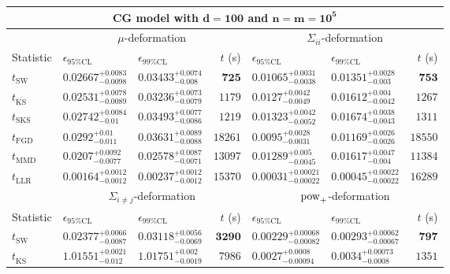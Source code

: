 \begin{tabular}{l|llr|llr}
	\toprule
	\multicolumn{7}{c}{{\bf CG model with $\mathbf{d=100}$ and $\mathbf{n=m=10^{5}}$}} \\
	\toprule
	\multicolumn{1}{c}{} & \multicolumn{3}{c}{$\mu$-deformation} & \multicolumn{3}{c}{$\Sigma_{ii}$-deformation} \\
	Statistic & $\epsilon_{95\%\mathrm{CL}}$ & $\epsilon_{99\%\mathrm{CL}}$ & $t$ (s) & $\epsilon_{95\%\mathrm{CL}}$ & $\epsilon_{99\%\mathrm{CL}}$ & $t$ (s) \\
	\midrule
	$t_{\mathrm{SW}}$ & $0.02667_{-0.0098}^{+0.0083}$ & $0.03433_{-0.008}^{+0.0074}$ & ${\mathbf{725}}$ & $0.01065_{-0.0038}^{+0.0031}$ & $0.01351_{-0.003}^{+0.0028}$ & ${\mathbf{753}}$ \\
	$t_{\overline{\mathrm{KS}}}$ & $0.02531_{-0.0089}^{+0.0078}$ & $0.03236_{-0.0079}^{+0.0073}$ & $1179$ & $0.0127_{-0.0049}^{+0.0042}$ & $0.01612_{-0.0042}^{+0.004}$ & $1267$ \\
	$t_{\mathrm{SKS}}$ & $0.02742_{-0.01}^{+0.0084}$ & $0.03493_{-0.0086}^{+0.0077}$ & $1219$ & $0.01323_{-0.0052}^{+0.0042}$ & $0.01674_{-0.0043}^{+0.0038}$ & $1311$ \\
	$t_{\mathrm{FGD}}$ & $0.0292_{-0.011}^{+0.01}$ & $0.03631_{-0.0088}^{+0.0089}$ & $18261$ & ${\mathbf{0.0095_{-0.0031}^{+0.0028}}}$ & ${\mathbf{0.01169_{-0.0026}^{+0.0026}}}$ & $18550$ \\
	$t_{\mathrm{MMD}}$ & ${\mathbf{0.0207_{-0.0077}^{+0.0092}}}$ & ${\mathbf{0.02578_{-0.0071}^{+0.0087}}}$ & $13097$ & $0.01289_{-0.0045}^{+0.005}$ & $0.01617_{-0.004}^{+0.0047}$ & $11384$ \\
	$t_{\mathrm{LLR}}$ & $0.00164_{-0.0012}^{+0.0012}$ & $0.00237_{-0.0012}^{+0.0012}$ & $15370$ & $0.00031_{-0.00022}^{+0.00021}$ & $0.00045_{-0.00022}^{+0.00022}$ & $16289$ \\
	\toprule
	\multicolumn{1}{c}{} & \multicolumn{3}{c}{$\Sigma_{i\neq j}$-deformation} & \multicolumn{3}{c}{$\rm{pow}_{+}$-deformation} \\
	Statistic & $\epsilon_{95\%\mathrm{CL}}$ & $\epsilon_{99\%\mathrm{CL}}$ & $t$ (s) & $\epsilon_{95\%\mathrm{CL}}$ & $\epsilon_{99\%\mathrm{CL}}$ & $t$ (s) \\
	\midrule
	$t_{\mathrm{SW}}$ & $0.02377_{-0.0087}^{+0.0066}$ & $0.03118_{-0.0069}^{+0.0056}$ & ${\mathbf{3290}}$ & $0.00229_{-0.00082}^{+0.00068}$ & $0.00293_{-0.00067}^{+0.00062}$ & ${\mathbf{797}}$ \\
	$t_{\overline{\mathrm{KS}}}$ & $1.01551_{-0.012}^{+0.0021}$ & $1.01751_{-0.0019}^{+0.002}$ & $7986$ & $0.0027_{-0.00094}^{+0.0008}$ & $0.0034_{-0.0008}^{+0.00073}$ & $1351$ \\

\end{tabular}
